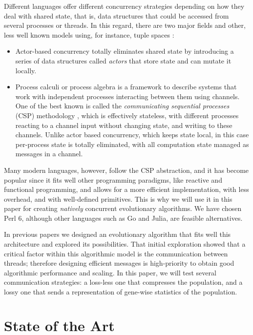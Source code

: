 \documentclass[runningheads]{llncs}\usepackage[]{graphicx}\usepackage[]{color}
\begin{document}
Different languages offer different concurrency strategies depending on how they deal with shared state,
that is, data structures that could be accessed from several processes or
threads. In this regard, there are two major fields and other, less well known models using, for instance, tuple
  spaces \cite{gelernter1985generative}:
\begin{itemize}
\item Actor-based concurrency \cite{schippers2009towards}
totally eliminates shared state by introducing a series of data
structures called {\em actors} that
store state and can mutate it locally. 
\item Process calculi or process algebra is a framework to describe
  systems that work with independent
  processes interacting between them using channels. One of the best
  known is called the {\em communicating sequential processes} (CSP)
methodology \cite{Hoare:1978:CSP:359576.359585}, which is effectively
stateless, with different processes reacting to a channel input without
changing state, and writing to these channels. Unlike actor based
concurrency, which keeps state local, in this case per-process state is totally
eliminated, with all computation state managed as messages in a channel.
\end{itemize}

Many modern languages, however, follow the CSP abstraction, and it has
become popular since it fits well other programming paradigms, like
reactive and functional programming, and allows for a more efficient
implementation, with less overhead, and with well-defined
primitives. This is why we will use it in this paper for creating  {\em natively}
concurrent evolutionary algorithms. We have chosen Perl 6, although 
other languages such as Go and Julia, are feasible alternatives.

In previous papers
\cite{Merelo:2018:MEA:3205651.3208317:anon,merelo:WEA:anon} we
designed an evolutionary algorithm that fits well this architecture
and explored its possibilities. That initial exploration showed that
a critical factor within this algorithmic model is the communication between threads; therefore designing
efficient messages is high-priority to obtain good algorithmic
performance and scaling. In this paper, we will test several
communication strategies: a loss-less one that compresses the population,
and a lossy one that sends a representation of gene-wise
statistics of the population.

\section{State of the Art}
\end{document}
